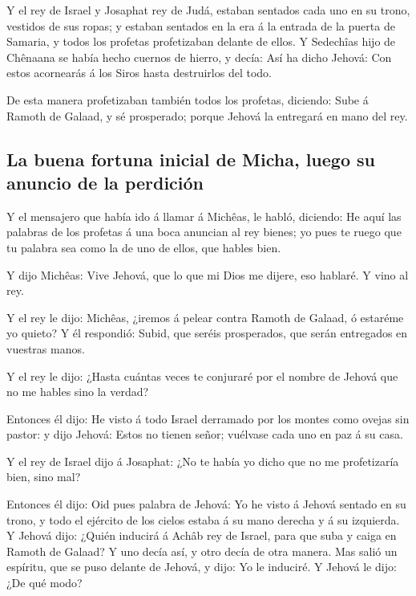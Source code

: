 Y el rey de Israel y Josaphat rey de Judá, estaban
sentados cada uno en su trono, vestidos de sus ropas; y estaban sentados
en la era á la entrada de la puerta de Samaria, y todos los profetas
profetizaban delante de ellos.  Y Sedechîas hijo de
Chênaana se había hecho cuernos de hierro, y decía: Así ha dicho Jehová:
Con estos acornearás á los Siros hasta destruirlos del todo.

 De esta manera profetizaban también todos los profetas,
diciendo: Sube á Ramoth de Galaad, y sé prosperado; porque Jehová la
entregará en mano del rey.

\hypertarget{la-buena-fortuna-inicial-de-micha-luego-su-anuncio-de-la-perdiciuxf3n}{%
\subsection{La buena fortuna inicial de Micha, luego su anuncio de la
perdición}\label{la-buena-fortuna-inicial-de-micha-luego-su-anuncio-de-la-perdiciuxf3n}}

 Y el mensajero que había ido á llamar á Michêas, le
habló, diciendo: He aquí las palabras de los profetas á una boca
anuncian al rey bienes; yo pues te ruego que tu palabra sea como la de
uno de ellos, que hables bien.

 Y dijo Michêas: Vive Jehová, que lo que mi Dios me
dijere, eso hablaré. Y vino al rey.

 Y el rey le dijo: Michêas, ¿iremos á pelear contra
Ramoth de Galaad, ó estaréme yo quieto? Y él respondió: Subid, que
seréis prosperados, que serán entregados en vuestras manos.

 Y el rey le dijo: ¿Hasta cuántas veces te conjuraré por
el nombre de Jehová que no me hables sino la verdad?

 Entonces él dijo: He visto á todo Israel derramado por
los montes como ovejas sin pastor: y dijo Jehová: Estos no tienen señor;
vuélvase cada uno en paz á su casa.

 Y el rey de Israel dijo á Josaphat: ¿No te había yo
dicho que no me profetizaría bien, sino mal?

 Entonces él dijo: Oid pues palabra de Jehová: Yo he
visto á Jehová sentado en su trono, y todo el ejército de los cielos
estaba á su mano derecha y á su izquierda.  Y Jehová
dijo: ¿Quién inducirá á Achâb rey de Israel, para que suba y caiga en
Ramoth de Galaad? Y uno decía así, y otro decía de otra manera.
 Mas salió un espíritu, que se puso delante de Jehová, y
dijo: Yo le induciré. Y Jehová le dijo: ¿De qué modo?

